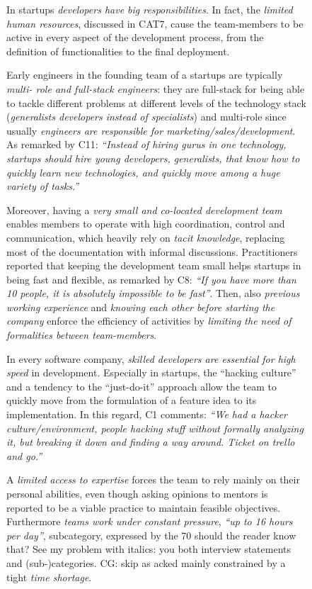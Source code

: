 \documentclass[12pt,journal,compsoc]{../sty/IEEEtran}
\begin{document}
\begin{table}[!t]
\begin{figure}[!t]
In startups \textit{developers have big responsibilities}. In fact, the
\textit{limited human resources}, discussed in CAT7, cause the team-members to
be active in every aspect of the development process, from the definition of
functionalities to the final deployment.

Early engineers in the founding team of a startups are typically  \textit{multi-
role and full-stack engineers}: they are full-stack for being able  to tackle
different problems at different levels of the technology stack
(\textit{generalists developers instead of specialists}) and multi-role since
usually \textit{engineers are responsible for marketing/sales/development}. As
remarked by  C11: \textit{``Instead of hiring gurus in one technology, startups
should hire young developers, generalists, that know how to quickly learn new
technologies, and quickly move among a huge variety of tasks.''}

Moreover, having a \textit{very small and co-located development team} enables
members to operate with high coordination, control and communication, which
heavily rely on \textit{tacit knowledge},  replacing most of the documentation
with informal discussions. Practitioners reported that keeping the development
team small helps startups in being fast and flexible, as remarked by C8:
\textit{``If you have more than 10 people, it is absolutely impossible to be
fast''}. Then, also \textit{previous working experience} and \textit{knowing
each other before starting the company} enforce the efficiency of activities by
\textit{limiting the need of formalities between team-members}.

In every software company, \textit{skilled developers are essential for high
speed} in development. Especially in startups, the ``hacking culture'' and a
tendency to the ``just-do-it'' approach allow the team to quickly move from the
formulation of a feature idea to its implementation. In this regard, C1
comments: \textit{``We had a hacker culture/environment, people hacking stuff
without formally analyzing it, but breaking it down and finding a way around.
Ticket on trello and go.''}

A \textit{limited access to expertise} forces the team to rely mainly on their
personal abilities, even though asking opinions to mentors is reported to be a
viable practice to maintain feasible objectives. Furthermore \textit{teams work
under constant pressure}, \textit{``up to 16 hours per day''}, %
subcategory, expressed by the 70%
should the reader know that? See my problem with italics: you  %
both interview statements and (sub-)categories. CG: skip as acked mainly
constrained by a tight \textit{time shortage}.


\end{figure}
\end{table}
\end{document}
